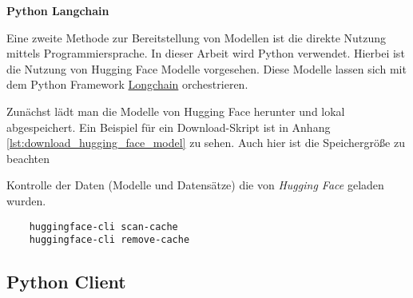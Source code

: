 \textbf{Python Langchain}\vspace{0.2cm}

Eine zweite Methode zur Bereitstellung von Modellen ist die direkte Nutzung mittels Programmiersprache. In dieser Arbeit wird Python verwendet. Hierbei ist die Nutzung von Hugging Face Modelle vorgesehen. Diese Modelle lassen sich mit dem Python Framework \href{https://pypi.org/project/langchain/}{Longchain} orchestrieren.\vspace{0.2cm}

Zunächst lädt man die Modelle von Hugging Face herunter und lokal abgespeichert. Ein Beispiel für ein Download-Skript ist in Anhang \ref{lst:download_hugging_face_model} zu sehen. Auch hier ist die Speichergröße zu beachten




Kontrolle der Daten (Modelle und Datensätze) die von \textit{Hugging Face} geladen wurden.

\begin{verbatim}
	huggingface-cli scan-cache
	huggingface-cli remove-cache
\end{verbatim}






\subsection{Python Client}


